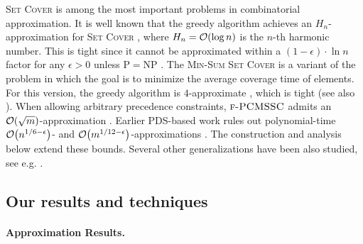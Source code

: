 \textup{\textsc{Set Cover}} is among the most important problems in combinatorial approximation.
It is well known that the greedy algorithm achieves an $H_n$-approximation for \textup{\textsc{Set Cover}} \cite{GreedyHeuristicSetCoverProblem}, where $H_n=\mathcal{O}\mathopen{}\left( \log n \right)$ is the $n$-th harmonic number. This is tight since it cannot be approximated within a $(1-\epsilon)\cdot\ln n$ factor for any $\epsilon > 0$ unless $\mathrm{P}=\mathrm{NP}$ \cite{AnalyticalApproachToParallelRepetition}.
The \textup{\textsc{Min-Sum Set Cover}} is a variant of the problem in which the goal is to minimize the average coverage time of elements. For this version, the greedy algorithm is $4$-approximate \cite{ApproximatingMinSumSetCover}, which is tight (see also \cite{BansalBFT21}).
When allowing arbitrary precedence constraints, $\textup{\textsc{f-PCMSSC}}$ admits an $\mathcal{O}\mathopen{}\left( \sqrt{m} \right)$-approximation \cite{PCMSSC}. Earlier PDS-based work rules out polynomial-time $\mathcal{O}\mathopen{}\left( n^{1/6-\epsilon} \right)$- and $\mathcal{O}\mathopen{}\left( m^{1/12-\epsilon} \right)$-approximations \cite{PCMSSC}. The construction and analysis below extend these bounds.
Several other generalizations have been also studied, see e.g. \cite{AzarGY09,AzarG11,BansalGK10,DeshpandeHK14}.

\subsection{Our results and techniques} \label{sec:our-results}


\paragraph{Approximation Results.}

% 

